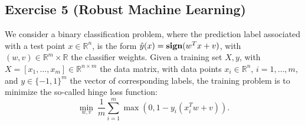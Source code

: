\documentclass[11pt]{article}
\begin{document}
\begin{solution}
\end{solution}

\newpage
\subsection*{Exercise 5 (Robust Machine Learning)}

We consider a binary classification problem, where the prediction label associated with a test point $x \in \mathbb{R}^{n}$, is the form $\hat{y}(x) = \mbox{\bf sign}(w^Tx+v)$, with $(w,v) \in \mathbb{R}^{m} \times \mathbb{R}$ the classifier weights. Given a training set $X,y$, with $X = [x_1,\ldots,x_m]\in \mathbb{R}^{n \times m}$ the data matrix, with data points $x_i \in \mathbb{R}^{n}$, $i=1,\ldots,m$, and $y \in \{-1,1\}^m$ the vector of corresponding labels, the training problem is to minimize the so-called hinge loss function:
\begin{equation}\label{eq:hinge}
    \min_{w,v} \: \frac{1}{m}\sum_{i=1}^m \max(0,1-y_i(x_i^Tw + v)).
\end{equation}
\end{document}
